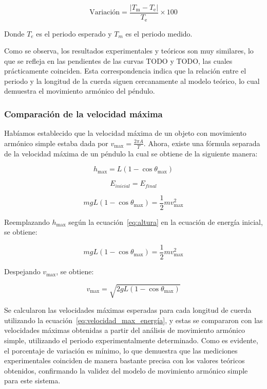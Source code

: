 \documentclass[letterpaper]{report}
\numberwithin{table}{section}
\begin{document}
\begin{equation}
  \text{Variación} = \frac{\lvert T_{\text{m}} -
  T_{\text{e}} \rvert}{T_{\text{e}}} \times 100
\end{equation}

Donde $T_{e}$ es el periodo esperado y $T_{m}$ es el periodo medido.

Como se observa, los resultados experimentales y teóricos son muy
similares, lo que se refleja en las pendientes de las curvas
{\color{red}TODO} y {\color{red}TODO},
las cuales prácticamente coinciden. Esta correspondencia indica que
la relación entre el periodo y la longitud de la cuerda siguen
cercanamente al modelo teórico, lo cual demuestra el movimiento
armónico del péndulo.

\subsubsection{Comparación de la velocidad máxima}

Habíamos establecido que la velocidad máxima de un objeto con
movimiento armónico simple estaba dada por $v_{\max} =
\frac{2\pi A}{T}$. Ahora, existe una fórmula separada de la velocidad
máxima de un péndulo la cual se obtiene de la siguiente manera:

\begin{equation}
  h_{\max} = L(1 - \cos{\theta_{\max}})\label{eq:altura}
\end{equation}

\begin{equation}
  E_{inicial} = E_{final}
\end{equation}

\begin{equation}
  mgL(1 - \cos{\theta_{\max}}) = \frac{1}{2}mv_{\max}^{2}
\end{equation}

Reemplazando $h_{\max}$ según la ecuación~\eqref{eq:altura} en la ecuación
de energía inicial, se obtiene:

\begin{equation}
  mgL(1 - \cos{\theta_{\max}}) = \frac{1}{2}mv_{\max}^{2}
\end{equation}

Despejando $v_{\max}$, se obtiene:

\begin{equation}
  v_{\max} = \sqrt{2gL(1 - \cos{\theta_{\max}})}\label{eq:velocidad_max_energía}
\end{equation}

Se calcularon las velocidades máximas esperadas para cada longitud de
cuerda utilizando la ecuación~\eqref{eq:velocidad_max_energía}, y
estas se compararon con las velocidades máximas obtenidas a partir
del análisis de movimiento armónico simple, utilizando el periodo
experimentalmente determinado. Como es evidente, el porcentaje de
variación es mínimo, lo que demuestra que las mediciones
experimentales coinciden de manera bastante precisa con los valores
teóricos obtenidos, confirmando la validez del modelo de movimiento
armónico simple para este sistema.
\end{document}
